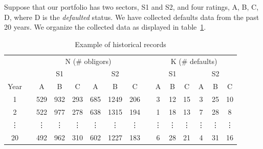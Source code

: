 \documentclass[11pt,fleqn]{book} %
\begin{document}
\begin{example}[]
	Suppose that our portfolio has two sectors, S1 and S2, and four ratings, 
	A, B, C, D, where D is the \emph{defaulted} status. We have collected 
	defaults data from the past 20 years. We organize the collected data as 
	displayed in table~\ref{table:histdata}.
	\begin{table}[!ht]
		\centering
		\begin{tabular}{cc|c|c|c||c|c|c|  c  |c|c|c||c|c|c|}
			\cline{3-8} \cline{10-15}
			& & \multicolumn{6}{|c|}{N (\# obligors)} & & \multicolumn{6}{|c|}{K (\# defaults)} \\
			\cline{3-8} \cline{10-15}
			& & \multicolumn{3}{|c||}{S1} & \multicolumn{3}{|c|}{S2} & & \multicolumn{3}{|c||}{S1} & \multicolumn{3}{|c|}{S2} \\
			\cline{1-1} \cline{3-8} \cline{10-15}
			\multicolumn{1}{|c|}{Year} & & A & B & C & A & B & C & & A & B & C & A & B & C \\
			\cline{1-1} \cline{3-8} \cline{10-15}
			\multicolumn{1}{|c|}{1} & & 529 & 932 & 293 & 685 & 1249 & 206 & & 3 & 12 & 15 & 3 & 25 & 10 \\
			\cline{1-1} \cline{3-8} \cline{10-15}
			\multicolumn{1}{|c|}{2} & & 522 & 977 & 278 & 638 & 1315 & 194 & & 1 & 18 & 13 & 7 & 28 & 8 \\
			\cline{1-1} \cline{3-8} \cline{10-15}
			\multicolumn{1}{|c|}{\vdots} & & \vdots & \vdots & \vdots & \vdots & \vdots & \vdots & & \vdots & \vdots & \vdots & \vdots & \vdots & \vdots \\
			\cline{1-1} \cline{3-8} \cline{10-15}
			\multicolumn{1}{|c|}{20} & & 492 & 962 & 310 & 602 & 1227 & 183 & & 6 & 28 & 21 & 4 & 31 & 16 \\
			\cline{1-1} \cline{3-8} \cline{10-15}
		\end{tabular}
		\caption{Example of historical records}
		\label{table:histdata}
	\end{table}
\end{example}

\end{document}
